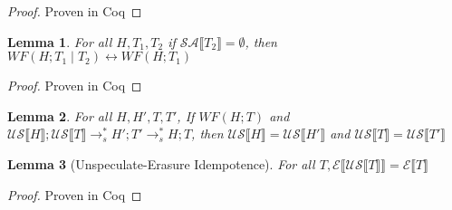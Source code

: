\documentclass[9pt]{article}
\newtheorem{lemma}{Lemma}
\newcommand\specStep{\rightarrow_{s}}
\newcommand{\erase}[1]{\mathcal{E}\llbracket #1 \rrbracket}
\newcommand{\unSpec}[1]{\mathcal{US} \llbracket #1 \rrbracket}
\newcommand{\specActions}[1]{\mathcal{SA} \llbracket #1 \rrbracket}
\begin{document}
\begin{proof}
Proven in Coq
\end{proof}

\begin{lemma}
\label{wfFrame}
For all $H, T_1, T_2$ if $\specActions{T_2} = \emptyset$, then $WF(H; T_1 \; | \; T_2) \leftrightarrow WF(H; T_1)$
\end{lemma}

\begin{proof}
Proven in Coq
\end{proof}

\begin{lemma}
\label{wfIntermediate}
For all $H, H', T, T'$, If $WF(H; T)$ and $\unSpec{H}; \unSpec{T} \specStep^* H'; T' \specStep^* H; T$, then $\unSpec{H} = \unSpec{H'}$ and $\unSpec{T} = \unSpec{T'}$
\end{lemma}

\begin{lemma}[Unspeculate-Erasure Idempotence]
\label{usEraseIdem}
For all $T, \erase{\unSpec{T}} = \erase{T}$

\end{lemma}

\begin{proof}
Proven in Coq
\end{proof}
\end{document}
